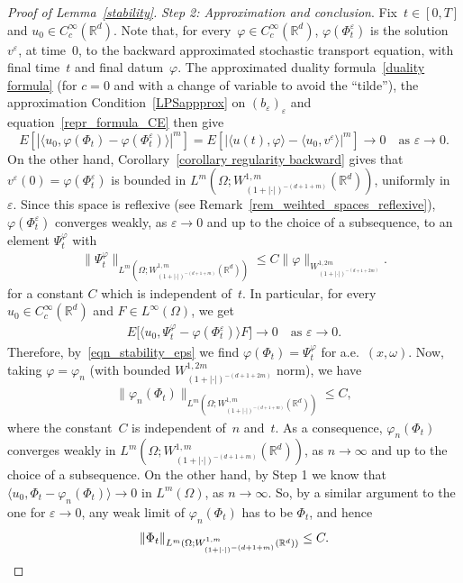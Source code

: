 \documentclass[a4paper,10pt]{article}
\newcommand\1{\mathbbm{1}}
\newcommand{\mr}{\mathbb{R}}
\newcommand{\lan}{\langle}
\newcommand{\ran}{\rangle}
\newcommand{\eps}{\varepsilon}
\numberwithin{equation}{section}
\begin{document}
\begin{proof}[Proof of Lemma~\ref{stability}]
\emph{Step 2: Approximation and conclusion}. Fix~$t \in [0,T]$ and $u_0 \in C^\infty_c(\mr^d)$. Note that, for every~$\varphi \in C^\infty_c(\mr^d)$, $\varphi(\Phi^\eps_t)$ is the solution $v^\eps$, at time~$0$, to the backward approximated stochastic transport equation, with final time~$t$ and final datum~$\varphi$. The approximated duality formula~\eqref{duality formula} (for $c=0$ and with a change of variable to avoid the ``tilde''), the approximation Condition~\ref{LPSappprox} on $(b_\eps)_\eps$ and equation~\eqref{repr_formula_CE} then give
\begin{equation}
\label{eqn_stability_eps}
E\left[\left|\lan u_0,\varphi(\Phi_t)-\varphi(\Phi^\eps_t)\ran \right|^m\right] = E\left[\left| \lan u(t),\varphi\ran -\lan u_0,v^\eps\ran \right|^m\right] \rightarrow 0 \quad \text{as } \eps \to 0.
\end{equation}
On the other hand, Corollary~\ref{corollary regularity backward} gives that $v^\eps(0) = \varphi(\Phi^\eps_t)$ is bounded in $L^m(\Omega;W^{1,m}_{(1+|\cdot|)^{-(d+1+m)}}(\mr^d))$, uniformly in~$\eps$. Since this space is reflexive (see Remark~\ref{rem_weihted_spaces_reflexive}), $\varphi(\Phi^\eps_t)$ converges weakly, as $\eps\rightarrow0$ and up to the choice of a subsequence, to an element $\Psi^\varphi_t$ with
\begin{align*}
\|\Psi^\varphi_t\|_{L^m(\Omega;W^{1,m}_{(1+|\cdot|)^{-(d+1+m)}}(\mr^d))} \le C\|\varphi\|_{W^{1,2m}_{(1+|\cdot|)^{-(d+1+2m)}}}.
\end{align*}
for a constant $C$ which is independent of~$t$. In particular, for every $u_0 \in C^\infty_c(\mr^d)$ and $F \in L^\infty(\Omega)$, we get
\begin{align*}
E\big[\lan u_0,\Psi^\varphi_t-\varphi(\Phi^\eps_t)\ran F\big]\rightarrow 0 \quad \text{as } \eps \to 0.
\end{align*}
Therefore, by~\eqref{eqn_stability_eps} we find $\varphi(\Phi_t)=\Psi^\varphi_t$ for a.e.~$(x,\omega)$. Now, taking $\varphi=\varphi_n$ (with bounded $W^{1,2m}_{(1+|\cdot|)^{-(d+1+2m)}}$ norm), we have
\begin{align*}
\|\varphi_n(\Phi_t)\|_{L^m(\Omega;W^{1,m}_{(1+|\cdot|)^{-(d+1+m)}}(\mr^d))} \le C,
\end{align*}
where the constant~$C$ is independent of~$n$ and~$t$. As a consequence, $\varphi_n(\Phi_t)$ converges weakly in $L^m(\Omega;W^{1,m}_{(1+|\cdot|)^{-(d+1+m)}}(\mr^d))$, as $n\rightarrow\infty$ and up to the choice of a subsequence. On the other hand, by Step 1 we know that $\lan u_0,\Phi_t-\varphi_n(\Phi_t)\ran \to 0$ in $L^m(\Omega)$, as $n \to \infty$. So, by a similar argument to the one for $\eps\rightarrow0$, any weak limit of $\varphi_n(\Phi_t)$ has to be $\Phi_t$, and hence
\begin{equation*}
\|\Phi_t\|_{L^m(\Omega;W^{1,m}_{(1+|\cdot|)^{-(d+1+m)}}(\mr^d))} \le C. \qedhere
\end{equation*}
\end{proof}
\end{document}
